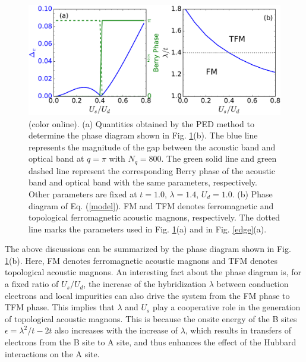 \documentclass[amsmath,superscriptaddress,showpacs,aps,prb,twocolumn]{revtex4-1}
\begin{document}
\begin{figure}
\includegraphics[scale=0.35]{gap_berry_and_phase_diagram}
\caption{(color online). (a) Quantities obtained by the PED method to determine the phase diagram shown in Fig. \ref{gap}(b). The blue line represents the magnitude of the gap between the acoustic band and optical band at $q=\pi$ with $N_q=800$. The green solid line and green dashed line represent the corresponding Berry phase of the acoustic band and optical band with the same parameters, respectively. Other parameters are fixed at $t=1.0$, $\lambda=1.4$, $U_d=1.0$. (b) Phase diagram of Eq. (\ref{model}). FM and TFM denotes ferromagnetic  and topological ferromagnetic acoustic magnons, respectively. The dotted line marks the parameters used in Fig. \ref{gap}(a) and in Fig. \ref{edge}(a).}
\label{gap}
\end{figure}

\par The above discussions can be summarized by the phase diagram shown in Fig. \ref{gap}(b). Here, FM denotes ferromagnetic acoustic magnons and TFM denotes topological acoustic magnons. An interesting fact about the phase diagram is, for a fixed ratio of $U_s/U_d$, the increase of the hybridization $\lambda$ between conduction electrons and local impurities can also drive the system from the FM phase to TFM phase. This implies that $\lambda$ and $U_s$ play a cooperative role in the generation of topological acoustic magnons. This is because the onsite energy of the B sites $\epsilon=\lambda^2/t-2t$ also increases with the increase of $\lambda$, which results in transfers of electrons from the B site to A site, and thus enhances the effect of the Hubbard interactions on the A site.
\end{document}
